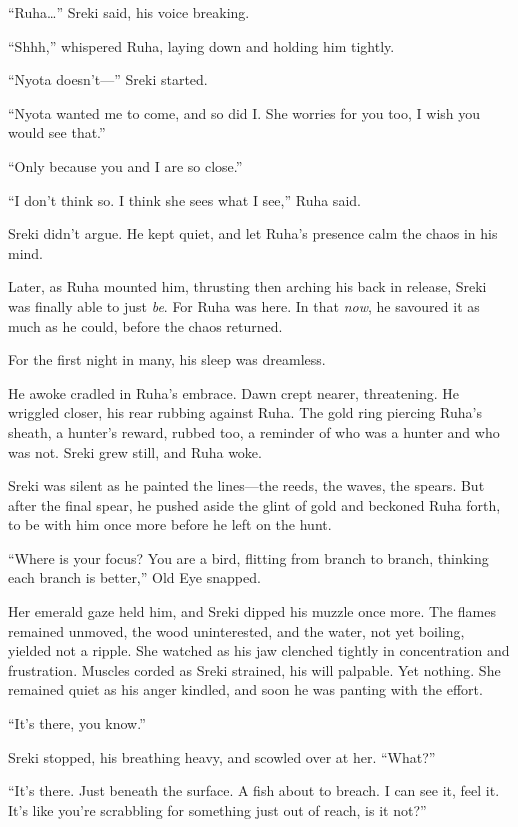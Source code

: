 ``Ruha\ldots'' Sreki said, his voice breaking.

``Shhh,'' whispered Ruha, laying down and holding him tightly.

``Nyota doesn't---'' Sreki started.

``Nyota wanted me to come, and so did I. She worries for you too, I wish you would see that.''

``Only because you and I are so close.''

``I don't think so. I think she sees what I see,'' Ruha said.

Sreki didn't argue. He kept quiet, and let Ruha's presence calm the chaos in his mind.

Later, as Ruha mounted him, thrusting then arching his back in release, Sreki was finally able to just \emph{be}. For Ruha was here. In that \emph{now}, he savoured it as much as he could, before the chaos returned.

For the first night in many, his sleep was dreamless.

He awoke cradled in Ruha's embrace. Dawn crept nearer, threatening. He wriggled closer, his rear rubbing against Ruha. The gold ring piercing Ruha's sheath, a hunter's reward, rubbed too, a reminder of who was a hunter and who was not. Sreki grew still, and Ruha woke.

Sreki was silent as he painted the lines---the reeds, the waves, the spears. But after the final spear, he pushed aside the glint of gold and beckoned Ruha forth, to be with him once more before he left on the hunt.

\secdiv

``Where is your focus? You are a bird, flitting from branch to branch, thinking each branch is better,'' Old Eye snapped.

Her emerald gaze held him, and Sreki dipped his muzzle once more. The flames remained unmoved, the wood uninterested, and the water, not yet boiling, yielded not a ripple. She watched as his jaw clenched tightly in concentration and frustration. Muscles corded as Sreki strained, his will palpable. Yet nothing. She remained quiet as his anger kindled, and soon he was panting with the effort.

``It's there, you know.''

Sreki stopped, his breathing heavy, and scowled over at her. ``What?''

``It's there. Just beneath the surface. A fish about to breach. I can see it, feel it. It's like you're scrabbling for something just out of reach, is it not?''

